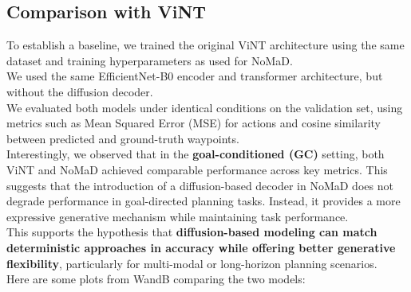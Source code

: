 \documentclass[12pt]{article}
\begin{document}
\subsection*{Comparison with ViNT}
To establish a baseline, we trained the original ViNT architecture using the same dataset and training hyperparameters as used for NoMaD.\\
We used the same EfficientNet-B0 encoder and transformer architecture, but without the diffusion decoder.\\
We evaluated both models under identical conditions on the validation set, using metrics such as Mean Squared Error (MSE) for actions and cosine similarity between predicted and ground-truth waypoints.\\
Interestingly, we observed that in the \textbf{goal-conditioned (GC)} setting, both ViNT and NoMaD achieved comparable performance across key metrics. This suggests that the introduction of a diffusion-based decoder in NoMaD does not degrade performance in goal-directed planning tasks. Instead, it provides a more expressive generative mechanism while maintaining task performance.\\
This supports the hypothesis that \textbf{diffusion-based modeling can match deterministic approaches in accuracy while offering better generative flexibility}, particularly for multi-modal or long-horizon planning scenarios.\\
Here are some plots from WandB comparing the two models:\\
\end{document}
